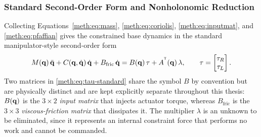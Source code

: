 \subsubsection{Standard Second-Order Form and Nonholonomic Reduction}\label{meth:subsec:reduced}

Collecting Equations~\eqref{meth:eq:mass}, \eqref{meth:eq:coriolis}, \eqref{meth:eq:inputmat}, and \eqref{meth:eq:pfaffian} gives the constrained base dynamics in the standard manipulator-style second-order form
\begin{equation}\label{meth:eq:tau-standard}
M(\mathbf{q})\,\ddot{\mathbf{q}}
+ C(\mathbf{q},\dot{\mathbf{q}})\,\dot{\mathbf{q}}
+ B_{\mathrm{fric}}\,\dot{\mathbf{q}}
= B(\mathbf{q})\,\tau
+ A^{^{\mathsf{T}}}(\mathbf{q})\,\lambda,
\qquad
\tau=\begin{bmatrix}\tau_R\\\tau_L\end{bmatrix}.
\end{equation}
Two matrices in \eqref{meth:eq:tau-standard} share the symbol $B$ by convention but are physically distinct and are kept explicitly separate throughout this thesis: $B(\mathbf{q})$ is the $3\times2$ \emph{input matrix} that injects actuator torque, whereas $B_{\mathrm{fric}}$ is the $3\times3$ \emph{viscous-friction matrix} that dissipates it. The multiplier $\lambda$ is an unknown to be eliminated, since it represents an internal constraint force that performs no work and cannot be commanded.

